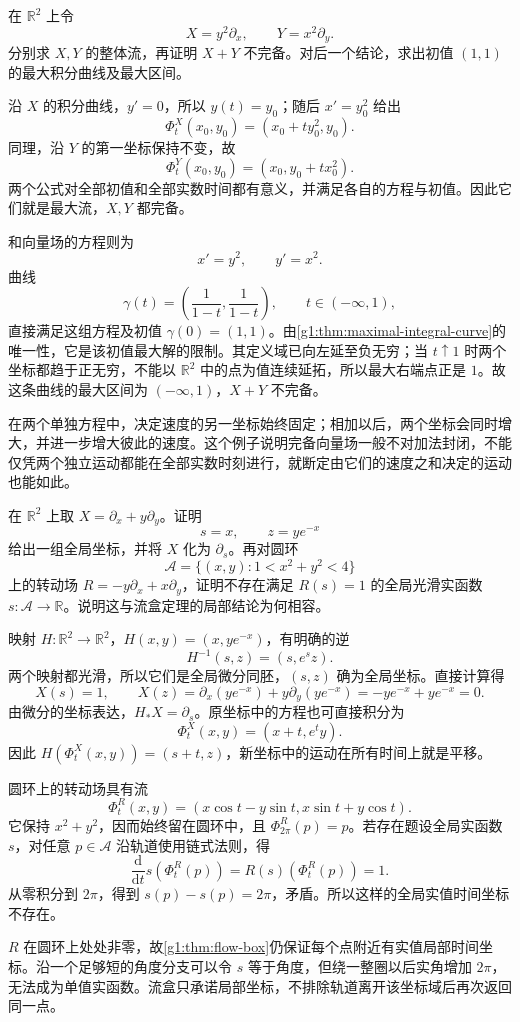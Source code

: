 \begin{exercise}\label{g1:ex:sum-of-complete-fields}
	在 \(\mathbb R^2\) 上令
	\[
		X=y^2\partial_x,\qquad Y=x^2\partial_y.
	\]
	分别求 \(X,Y\) 的整体流，再证明 \(X+Y\) 不完备。对后一个结论，求出初值 \((1,1)\) 的最大积分曲线及最大区间。
\end{exercise}
\begin{solution}
	沿 \(X\) 的积分曲线，\(y'=0\)，所以 \(y(t)=y_0\)；随后 \(x'=y_0^2\) 给出
	\[
		\Phi_t^X(x_0,y_0)=(x_0+t y_0^2,y_0).
	\]
	同理，沿 \(Y\) 的第一坐标保持不变，故
	\[
		\Phi_t^Y(x_0,y_0)=(x_0,y_0+t x_0^2).
	\]
	两个公式对全部初值和全部实数时间都有意义，并满足各自的方程与初值。因此它们就是最大流，\(X,Y\) 都完备。

	和向量场的方程则为
	\[
		x'=y^2,\qquad y'=x^2.
	\]
	曲线
	\[
		\gamma(t)=\left(\frac1{1-t},\frac1{1-t}\right),\qquad t\in(-\infty,1),
	\]
	直接满足这组方程及初值 \(\gamma(0)=(1,1)\)。由\cref{g1:thm:maximal-integral-curve}的唯一性，它是该初值最大解的限制。其定义域已向左延至负无穷；当 \(t\uparrow1\) 时两个坐标都趋于正无穷，不能以 \(\mathbb R^2\) 中的点为值连续延拓，所以最大右端点正是 \(1\)。故这条曲线的最大区间为 \((-\infty,1)\)，\(X+Y\) 不完备。

	在两个单独方程中，决定速度的另一坐标始终固定；相加以后，两个坐标会同时增大，并进一步增大彼此的速度。这个例子说明完备向量场一般不对加法封闭，不能仅凭两个独立运动都能在全部实数时刻进行，就断定由它们的速度之和决定的运动也能如此。
\end{solution}

\begin{exercise}\label{g1:ex:global-flow-box-periodic-obstruction}
	在 \(\mathbb R^2\) 上取 \(X=\partial_x+y\partial_y\)。证明
	\[
		s=x,\qquad z=ye^{-x}
	\]
	给出一组全局坐标，并将 \(X\) 化为 \(\partial_s\)。再对圆环
	\[
		\mathcal A=\{(x,y):1<x^2+y^2<4\}
	\]
	上的转动场 \(R=-y\partial_x+x\partial_y\)，证明不存在满足 \(R(s)=1\) 的全局光滑实函数 \(s:\mathcal A\to\mathbb R\)。说明这与流盒定理的局部结论为何相容。
\end{exercise}
\begin{solution}
	映射 \(H:\mathbb R^2\to\mathbb R^2\)，\(H(x,y)=(x,ye^{-x})\)，有明确的逆
	\[
		H^{-1}(s,z)=(s,e^s z).
	\]
	两个映射都光滑，所以它们是全局微分同胚，\((s,z)\) 确为全局坐标。直接计算得
	\[
		X(s)=1,\qquad
		X(z)=\partial_x(ye^{-x})+y\partial_y(ye^{-x})=-ye^{-x}+ye^{-x}=0.
	\]
	由微分的坐标表达，\(H_*X=\partial_s\)。原坐标中的方程也可直接积分为
	\[
		\Phi_t^X(x,y)=(x+t,e^t y).
	\]
	因此 \(H(\Phi_t^X(x,y))=(s+t,z)\)，新坐标中的运动在所有时间上就是平移。

	圆环上的转动场具有流
	\[
		\Phi_t^R(x,y)=(x\cos t-y\sin t,x\sin t+y\cos t).
	\]
	它保持 \(x^2+y^2\)，因而始终留在圆环中，且 \(\Phi_{2\pi}^R(p)=p\)。若存在题设全局实函数 \(s\)，对任意 \(p\in\mathcal A\) 沿轨道使用链式法则，得
	\[
		\frac{\mathrm{d}}{\mathrm{d}t}s(\Phi_t^R(p))
		=R(s)(\Phi_t^R(p))=1.
	\]
	从零积分到 \(2\pi\)，得到 \(s(p)-s(p)=2\pi\)，矛盾。所以这样的全局实值时间坐标不存在。

	\(R\) 在圆环上处处非零，故\cref{g1:thm:flow-box}仍保证每个点附近有实值局部时间坐标。沿一个足够短的角度分支可以令 \(s\) 等于角度，但绕一整圈以后实角增加 \(2\pi\)，无法成为单值实函数。流盒只承诺局部坐标，不排除轨道离开该坐标域后再次返回同一点。
\end{solution}

